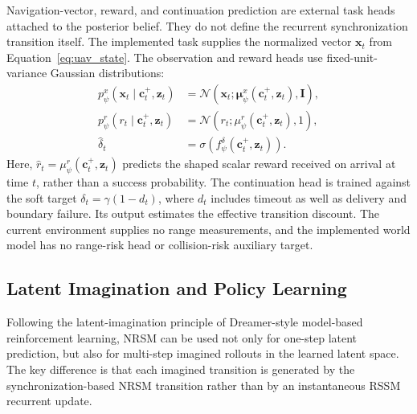 \documentclass{article}
\begin{document}
Navigation-vector, reward, and continuation prediction are external task heads attached to the posterior belief. They do not define the recurrent synchronization transition itself. The implemented task supplies the normalized vector $\mathbf x_t$ from Equation~\eqref{eq:uav_state}. The observation and reward heads use fixed-unit-variance Gaussian distributions:
\begin{align}
p_{\psi}^{x}(\mathbf x_t\mid\mathbf c_t^+,\mathbf z_t)
&=\mathcal N\!\left(\mathbf x_t;
\boldsymbol\mu_{\psi}^{x}(\mathbf c_t^+,\mathbf z_t),\mathbf I\right),
\label{eq:external_decoder}\\
p_{\psi}^{r}(r_t\mid\mathbf c_t^+,\mathbf z_t)
&=\mathcal N\!\left(r_t;
\mu_{\psi}^{r}(\mathbf c_t^+,\mathbf z_t),1\right),
\label{eq:external_reward}\\
\hat\delta_t&=\sigma\!\left(f_{\psi}^{\delta}(\mathbf c_t^+,\mathbf z_t)\right).
\label{eq:external_termination}
\end{align}
Here, $\hat r_t=\mu_{\psi}^{r}(\mathbf c_t^+,\mathbf z_t)$ predicts the shaped scalar reward received on arrival at time $t$, rather than a success probability. The continuation head is trained against the soft target $\delta_t=\gamma(1-d_t)$, where $d_t$ includes timeout as well as delivery and boundary failure. Its output estimates the effective transition discount. The current environment supplies no range measurements, and the implemented world model has no range-risk head or collision-risk auxiliary target.

\subsection{Latent Imagination and Policy Learning}

Following the latent-imagination principle of Dreamer-style model-based reinforcement learning, NRSM can be used not only for one-step latent prediction, but also for multi-step imagined rollouts in the learned latent space. The key difference is that each imagined transition is generated by the synchronization-based NRSM transition rather than by an instantaneous RSSM recurrent update.
\end{document}
